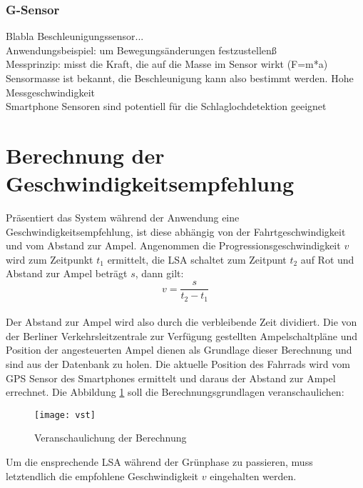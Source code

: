 \subsubsection{G-Sensor}
Blabla Beschleunigungssensor...\\ 
Anwendungsbeispiel: um Bewegungsänderungen festzustellenß\\
Messprinzip: misst die Kraft, die auf die Masse im Sensor wirkt (F=m*a)\\
Sensormasse ist bekannt, die Beschleunigung kann also bestimmt werden.
Hohe Messgeschwindigkeit \\ Smartphone Sensoren sind potentiell für die Schlaglochdetektion geeignet
\clearpage
\section{\label{sec:mathGrundlagen}Berechnung der Geschwindigkeitsempfehlung}
Präsentiert das System während der Anwendung eine Geschwindigkeitsempfehlung, ist diese abhängig von der Fahrtgeschwindigkeit und vom Abstand zur Ampel. Angenommen die Progressionsgeschwindigkeit $v$ wird zum Zeitpunkt $t_{1}$ ermittelt, die \gls {LSA} schaltet zum Zeitpunt $t_{2}$ auf Rot und Abstand zur Ampel beträgt $s$, dann gilt: \\
\[ v = \frac{s}{t_{2} - t_{1}} \] \\
Der Abstand zur Ampel wird also durch die verbleibende Zeit dividiert. 
Die von der Berliner Verkehrsleitzentrale zur Verfügung gestellten Ampelschaltpläne und Position der angesteuerten Ampel dienen als Grundlage dieser Berechnung und sind aus der Datenbank zu holen. Die aktuelle Position des Fahrrads wird vom \gls{GPS} Sensor des \glspl{Smartphone} ermittelt und daraus der Abstand zur Ampel errechnet. Die Abbildung \ref{fig:vst} soll die Berechnungsgrundlagen veranschaulichen: 
\begin{figure}[H]  
    \centering  
    \texttt{[image: vst]}     
    \caption[Berechnung Progressionsgeschwindigkeit]{Veranschaulichung der Berechnung}
    \label{fig:vst}
\end{figure}
Um die ensprechende \gls{LSA} während der Grünphase zu passieren, muss letztendlich die empfohlene Geschwindigkeit $v$ eingehalten werden.
